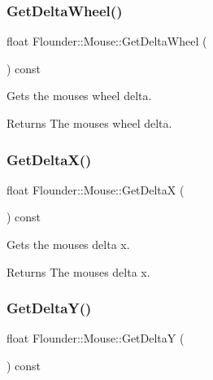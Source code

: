 \subsubsection{\texorpdfstring{Get\+Delta\+Wheel()}{GetDeltaWheel()}}
{\footnotesize\ttfamily float Flounder\+::\+Mouse\+::\+Get\+Delta\+Wheel (\begin{DoxyParamCaption}{ }\end{DoxyParamCaption}) const\hspace{0.3cm}{\ttfamily [inline]}}



Gets the mouses wheel delta. 

\begin{DoxyReturn}{Returns}
The mouses wheel delta. 
\end{DoxyReturn}
\mbox{\label{class_flounder_1_1_mouse_a231056bb59781251e989ffd10b64725a}} 
\subsubsection{\texorpdfstring{Get\+Delta\+X()}{GetDeltaX()}}
{\footnotesize\ttfamily float Flounder\+::\+Mouse\+::\+Get\+DeltaX (\begin{DoxyParamCaption}{ }\end{DoxyParamCaption}) const\hspace{0.3cm}{\ttfamily [inline]}}



Gets the mouses delta x. 

\begin{DoxyReturn}{Returns}
The mouses delta x. 
\end{DoxyReturn}
\mbox{\label{class_flounder_1_1_mouse_ab68a3ee8d03be4ef83cecbd83cb6a080}} 
\subsubsection{\texorpdfstring{Get\+Delta\+Y()}{GetDeltaY()}}
{\footnotesize\ttfamily float Flounder\+::\+Mouse\+::\+Get\+DeltaY (\begin{DoxyParamCaption}{ }\end{DoxyParamCaption}) const\hspace{0.3cm}{\ttfamily [inline]}}



